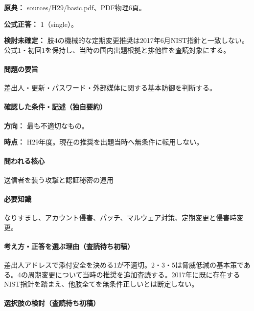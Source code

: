 \noindent\textbf{原典：} sources/H29/basic.pdf、PDF物理6頁。

\textbf{公式正答：} 1（single）。

\par\textbf{検討未確定：} 肢4の機械的な定期変更推奨は2017年6月NIST指針と一致しない。公式1・初回1を保持し、当時の国内出題根拠と排他性を査読対象にする。

\paragraph{問題の要旨} 差出人・更新・パスワード・外部媒体に関する基本防御を判断する。

\paragraph{確認した条件・記述（独自要約）}\mbox{}\par

\noindent\textbf{方向：} 最も不適切なもの。\par

\noindent\textbf{時点：} H29年度。現在の推奨を出題当時へ無条件に転用しない。\par

\paragraph{問われる核心} 送信者を装う攻撃と認証秘密の運用

\paragraph{必要知識} なりすまし、アカウント侵害、パッチ、マルウェア対策、定期変更と侵害時変更。

\paragraph{考え方・正答を選ぶ理由（査読待ち初稿）} 差出人アドレスで添付安全を決める1が不適切。2・3・5は脅威低減の基本策である。4の周期変更について当時の推奨を追加査読する。2017年に既に存在するNIST指針を踏まえ、他肢全てを無条件正しいとは断定しない。

\paragraph{選択肢の検討（査読待ち初稿）}\mbox{}\par

